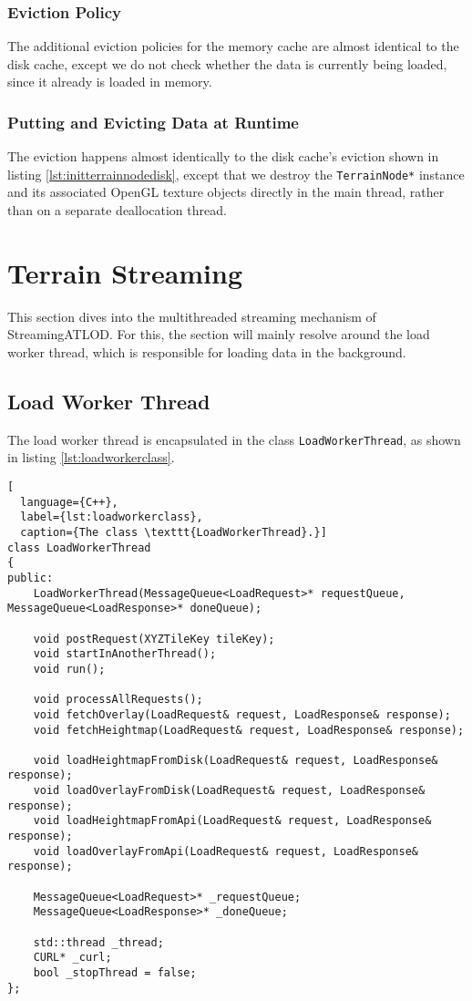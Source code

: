 \subsubsection{Eviction Policy}
The additional eviction policies for the memory cache are almost identical 
to the disk cache, except we do not check whether 
the data is currently being loaded, since it already 
is loaded in memory. 

\subsubsection{Putting and Evicting Data at Runtime}
The eviction happens almost 
identically to the disk cache's eviction shown in listing \ref{lst:initterrainnodedisk},
except that we destroy the \texttt{TerrainNode*} instance and its associated 
OpenGL texture objects directly in the main thread, rather 
than on a separate deallocation thread. 

\section{Terrain Streaming}
This section dives into the multithreaded streaming mechanism 
of StreamingATLOD. For this, the section will mainly resolve 
around the load worker thread, which is responsible for loading 
data in the background. 

\subsection{Load Worker Thread}
The load worker thread is encapsulated in the class \texttt{LoadWorkerThread},
as shown in listing \ref{lst:loadworkerclass}.

\begin{lstlisting}[
  language={C++},
  label={lst:loadworkerclass},
  caption={The class \texttt{LoadWorkerThread}.}]
class LoadWorkerThread
{
public:
    LoadWorkerThread(MessageQueue<LoadRequest>* requestQueue, MessageQueue<LoadResponse>* doneQueue);

    void postRequest(XYZTileKey tileKey);
    void startInAnotherThread();
    void run();

    void processAllRequests();
    void fetchOverlay(LoadRequest& request, LoadResponse& response);
    void fetchHeightmap(LoadRequest& request, LoadResponse& response);

    void loadHeightmapFromDisk(LoadRequest& request, LoadResponse& response);
    void loadOverlayFromDisk(LoadRequest& request, LoadResponse& response);
    void loadHeightmapFromApi(LoadRequest& request, LoadResponse& response);
    void loadOverlayFromApi(LoadRequest& request, LoadResponse& response);

    MessageQueue<LoadRequest>* _requestQueue;
    MessageQueue<LoadResponse>* _doneQueue;

    std::thread _thread;
    CURL* _curl;
    bool _stopThread = false;
};
\end{lstlisting}

